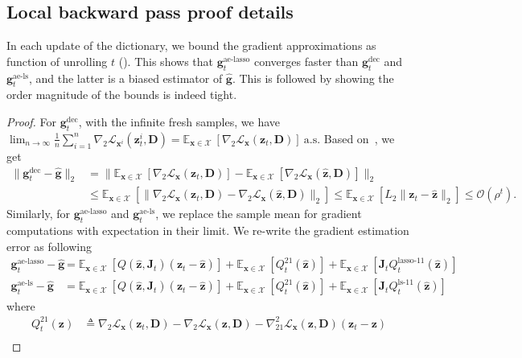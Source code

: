 \documentclass[10pt]{article} %
\newcommand{\E}{\mathbb{E}} %
\newcommand{\D}{{\bm D}}
\newcommand{\J}{{\bm J}}
\newcommand{\x}{{\bm x}}
\newcommand{\z}{{\bm z}}
\newcommand{\g}{{\bm g}}
\newcommand{\Loss}{\mathcal{L}}
\newcommand{\X}{\mathcal{X}}
\begin{document}
\subsection{Local backward pass proof details}
%
In each update of the dictionary, we bound the gradient approximations as function of unrolling $t$ (). This shows that $\g_t^{\text{ae-lasso}}$ converges faster than $\g_t^{\text{dec}}$ and $\g_t^{\text{ae-ls}}$, and the latter is a biased estimator of $\hat \g$. This is followed by  showing the order magnitude of the bounds is indeed tight.
%
\localgrad*
%
\begin{proof}
For $\g_t^{\text{dec}}$, with the infinite fresh samples, we have $\lim_{n \to \infty} \frac{1}{n} \sum_{i=1}^n \nabla_2 \Loss_{\x^i}(\z_t^{i}, \D)= \E_{\x \in \X}\ [\nabla_2 \Loss_{\x}(\z_t, \D)] \ \text{a.s.}$ Based on~, we get
\begin{equation}
\begin{aligned}
\| \g_t^{\text{dec}} - \hat \g \|_2 &= \| \E_{\x \in \X}\ [\nabla_2 \Loss_{\x}(\z_t, \D)] - \E_{\x \in \X}\ [\nabla_2 \Loss_{\x}(\hat \z, \D)] \|_2\\
&\leq  \E_{\x \in \X}\ [ \| \nabla_2 \Loss_{\x}(\z_t, \D) - \nabla_2 \Loss_{\x}(\hat \z, \D) \|_2 ]
\leq  \E_{\x \in \X}\ [ L_2 \| \z_t - \hat \z \|_2 ] \leq \mathcal{O}(\rho^t).
\end{aligned}
\end{equation}
%
Similarly, for $\g_t^{\text{ae-lasso}}$ and $\g_t^{\text{ae-ls}}$, we replace the sample mean for gradient computations with expectation in their limit. We re-write the gradient estimation error as following
\begin{equation}
\begin{aligned}
\g_t^{\text{ae-lasso}} - \hat \g  &= \E_{\x \in \X}\ [Q(\hat \z, \J_t) (\z_t - \hat \z)] + \E_{\x \in \X}\ [Q_t^{21}(\hat \z)] + \E_{\x \in \X}\ [\J_t Q_t^{\text{lasso-}11}(\hat \z)]\\
\g_t^{\text{ae-ls}} - \hat \g  &= \E_{\x \in \X}\ [Q(\hat \z, \J_t) (\z_t - \hat \z)] + \E_{\x \in \X}\ [Q_t^{21}(\hat \z)] + \E_{\x \in \X}\ [\J_t Q_t^{\text{ls-}11}(\hat \z)]
\end{aligned}
\end{equation}
where
\begin{equation}
\begin{aligned}
Q_t^{21}(\z) &\triangleq \nabla_2 \Loss_{\x}(\z_t, \D) -  \nabla_2 \Loss_{\x}(\z, \D) - \nabla_{21}^2\Loss_{\x}(\z, \D) (\z_t - \z)\\

\end{aligned}
\end{equation}
\end{proof}
\end{document}
